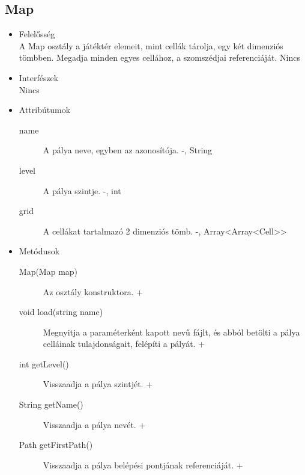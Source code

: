 \subsection{Map}
\begin{itemize}
\item Felelősség\\
A Map osztály a játéktér elemeit, mint cellák tárolja, egy két dimenziós tömbben. Megadja minden egyes cellához, a szomszédjai referenciáját. 
Nincs
\item Interfészek\\
Nincs
\item Attribútumok\\
	\begin{description}
		\item[name] A pálya neve, egyben az azonosítója. -, String 
		\item[level] A pálya szintje. -, int 
		\item[grid] A cellákat tartalmazó 2 dimenziós tömb. -, Array<Array<Cell>> 

		
	\end{description}
\item Metódusok\\
	\begin{description}
		
		\item[Map(Map map)] Az osztály konstruktora. +
\item[void load(string name)] Megnyitja a paraméterként kapott nevű fájlt, és abból betölti a pálya celláinak tulajdonságait, felépíti a pályát. +
\item[int getLevel()] Visszaadja a pálya szintjét. +
\item[String getName()] Visszaadja a pálya nevét. +
\item[Path getFirstPath()] Visszaadja a pálya belépési pontjának referenciáját. +

		
		
	\end{description}
\end{itemize}

